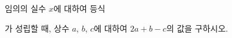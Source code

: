 임의의 실수 $x$에 대하여 등식 \par\smallskip{}\par\smallskip\noindent 가 성립할 때, 상수 $a$, $b$, $c$에 대하여 $2a+b-c$의 값을 구하시오.
